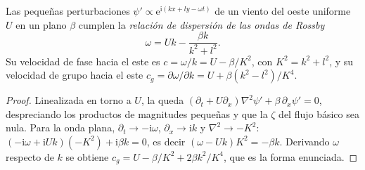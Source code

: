 \begin{theorem}\label{thm:b3:atmospheric-dynamics:rossby}
Las pequeñas perturbaciones $\psi' \propto \mathrm e^{\mathrm i(kx + ly - \omega t)}$
de un viento del oeste uniforme $U$ en un plano $\beta$ cumplen la
\emph{relación de dispersión de las ondas de Rossby}
\[
\omega = Uk - \frac{\beta k}{k^2 + l^2} .
\]
Su velocidad de fase hacia el este es $c = \omega/k = U - \beta/K^2$, con $K^2 =
k^2 + l^2$, y su velocidad de grupo hacia el este $c_g = \partial\omega/\partial
k = U + \beta(k^2 - l^2)/K^4$.
\end{theorem}

\begin{proof}
Linealizada en torno a $U$, la  queda
$(\partial_t + U\partial_x)\nabla^2\psi' + \beta\,\partial_x\psi' = 0$, despreciando los
productos de magnitudes pequeñas y que la $\zeta$ del flujo básico
sea nula. Para la onda plana, $\partial_t \to -\mathrm i\omega$,
$\partial_x \to \mathrm ik$ y $\nabla^2 \to -K^2$: $(-\mathrm i\omega +
\mathrm iUk)(-K^2) + \mathrm i\beta k = 0$, es decir $(\omega - Uk)K^2 =
-\beta k$. Derivando $\omega$ respecto de $k$ se obtiene $c_g = U -
\beta/K^2 + 2\beta k^2/K^4$, que es la forma enunciada.
\end{proof}

